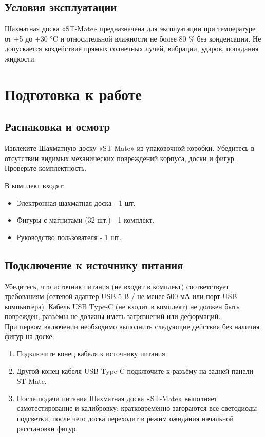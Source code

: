 \documentclass[a4paper,12pt]{article}
\begin{document}
\subsection{Условия эксплуатации}
Шахматная доска «ST-Mate» предназначена для эксплуатации при температуре от +5 до +30 °C и относительной влажности не более 80 \% без конденсации.
Не допускается воздействие прямых солнечных лучей, вибрации, ударов, попадания жидкости.

\section{Подготовка к работе}
\label{sec:preparation}

\subsection{Распаковка и осмотр}
Извлеките Шахматную доску «ST-Mate» из упаковочной коробки.
Убедитесь в отсутствии видимых механических повреждений корпуса, доски и фигур.
Проверьте комплектность.

В комплект входят:
\begin{itemize}
    \item Электронная шахматная доска - 1 шт.
    \item Фигуры с магнитами (32 шт.) - 1 комплект.
    \item Руководство пользователя - 1 шт.
\end{itemize}

\subsection{Подключение к источнику питания}
Убедитесь, что источник питания (не входит в комплект) соответствует требованиям (сетевой адаптер USB 5 В / не менее 500 мА или порт USB компьютера).
Кабель USB Type-C (не входит в комплект) не должен быть повреждён, разъёмы не должны иметь загрязнений или деформаций.\\
При первом включении необходимо выполнить следующие действия без наличия фигур на доске:
\begin{enumerate}
    \item Подключите конец кабеля к источнику питания.
    \item Другой конец кабеля USB Type-C подключите к разъёму на задней панели ST-Mate.
    \item После подачи питания Шахматная доска «ST-Mate» выполняет самотестирование и калибровку: кратковременно загораются все светодиоды подсветки, после чего доска переходит в режим ожидания начальной расстановки фигур.
\end{enumerate}
\end{document}
